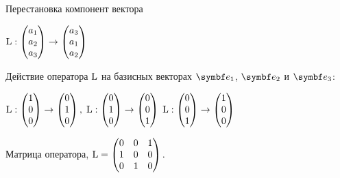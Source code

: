\begin{frame}{Перестановка компонент вектора}

$\operatorname{L} : \begin{pmatrix}
  a_1 \\
  a_2 \\
  a_3 \\
\end{pmatrix} \to 
\begin{pmatrix}
  a_3 \\
  a_1 \\
  a_2 \\
\end{pmatrix}$

\pause

Действие оператора $\operatorname{L}$ на базисных векторах $\be_1$, $\be_2$ и $\be_3$:

$\operatorname{L} : \begin{pmatrix}
  1 \\
  0 \\
  0 \\
\end{pmatrix} \to 
\begin{pmatrix}
  0 \\
  1 \\
  0 \\
\end{pmatrix}, \;
\operatorname{L} : \begin{pmatrix}
  0 \\
  1 \\
  0 \\
\end{pmatrix} \to 
\begin{pmatrix}
  0 \\
  0 \\
  1 \\
\end{pmatrix} \;
\operatorname{L} : \begin{pmatrix}
  0 \\
  0 \\
  1 \\
\end{pmatrix} \to 
\begin{pmatrix}
  1 \\
  0 \\
  0 \\
\end{pmatrix}$

\pause

Матрица оператора, $\operatorname{L} = 
\begin{pmatrix}
  0 & 0 & 1  \\
  1 & 0 & 0 \\
  0 & 1 & 0 \\
\end{pmatrix}.$



\end{frame}


